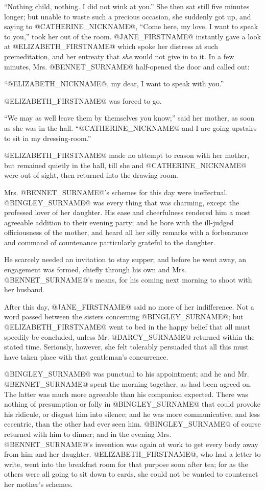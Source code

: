 ``Nothing child, nothing. I did not wink at you.'' She then sat still
five minutes longer; but unable to waste such a precious occasion, she
suddenly got up, and saying to @CATHERINE_NICKNAME@, ``Come here, my love, I want to
speak to you,'' took her out of the room. @JANE_FIRSTNAME@ instantly gave a look
at @ELIZABETH_FIRSTNAME@ which spoke her distress at such premeditation, and her
entreaty that \textit{she} would not give in to it. In a few minutes, Mrs.
@BENNET_SURNAME@ half-opened the door and called out:

``@ELIZABETH_NICKNAME@, my dear, I want to speak with you.''

@ELIZABETH_FIRSTNAME@ was forced to go.

``We may as well leave them by themselves you know;'' said her mother, as
soon as she was in the hall. ``@CATHERINE_NICKNAME@ and I are going upstairs to sit in
my dressing-room.''

@ELIZABETH_FIRSTNAME@ made no attempt to reason with her mother, but remained
quietly in the hall, till she and @CATHERINE_NICKNAME@ were out of sight, then returned
into the drawing-room.

Mrs. @BENNET_SURNAME@'s schemes for this day were ineffectual. @BINGLEY_SURNAME@ was every
thing that was charming, except the professed lover of her daughter. His
ease and cheerfulness rendered him a most agreeable addition to their
evening party; and he bore with the ill-judged officiousness of the
mother, and heard all her silly remarks with a forbearance and command
of countenance particularly grateful to the daughter.

He scarcely needed an invitation to stay supper; and before he went
away, an engagement was formed, chiefly through his own and Mrs.
@BENNET_SURNAME@'s means, for his coming next morning to shoot with her husband.

After this day, @JANE_FIRSTNAME@ said no more of her indifference. Not a word passed
between the sisters concerning @BINGLEY_SURNAME@; but @ELIZABETH_FIRSTNAME@ went to bed in
the happy belief that all must speedily be concluded, unless Mr. @DARCY_SURNAME@
returned within the stated time. Seriously, however, she felt tolerably
persuaded that all this must have taken place with that gentleman's
concurrence.

@BINGLEY_SURNAME@ was punctual to his appointment; and he and Mr. @BENNET_SURNAME@ spent
the morning together, as had been agreed on. The latter was much more
agreeable than his companion expected. There was nothing of presumption
or folly in @BINGLEY_SURNAME@ that could provoke his ridicule, or disgust him into
silence; and he was more communicative, and less eccentric, than the
other had ever seen him. @BINGLEY_SURNAME@ of course returned with him to dinner;
and in the evening Mrs. @BENNET_SURNAME@'s invention was again at work to get
every body away from him and her daughter. @ELIZABETH_FIRSTNAME@, who had a letter
to write, went into the breakfast room for that purpose soon after tea;
for as the others were all going to sit down to cards, she could not be
wanted to counteract her mother's schemes.

